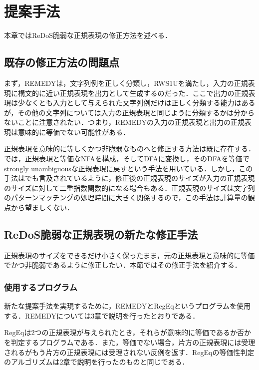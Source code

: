 \documentclass[a4paper, 12pt, dvipdfmx, uplatex]{jsreport}
\begin{document}
\chapter{提案手法}
本章ではReDoS脆弱な正規表現の修正方法を述べる．

\section{既存の修正方法の問題点}\label{issue}
まず，REMEDYは，文字列例を正しく分類し，RWS1Uを満たし，入力の正規表現に構文的に近い正規表現を出力として生成するのだった．ここで出力の正規表現は少なくとも入力として与えられた文字列例だけは正しく分類する能力はあるが，その他の文字列については入力の正規表現と同じように分類するかは分からないことに注意されたい．つまり，REMEDYの入力の正規表現と出力の正規表現は意味的に等価でない可能性がある．

正規表現を意味的に等しくかつ非脆弱なものへと修正する方法は既に存在する．\cite{harmless}では，正規表現と等価なNFAを構成，そしてDFAに変換し，そのDFAを等価でstrongly unambiguousな正規表現に戻すという手法を用いている．しかし，この手法は\cite{harmless}でも言及されているように，修正後の正規表現のサイズが入力の正規表現のサイズに対して二重指数関数的になる場合もある．正規表現のサイズは文字列のパターンマッチングの処理時間に大きく関係するので，この手法は計算量の観点から望ましくない．

\section{ReDoS脆弱な正規表現の新たな修正手法}
正規表現のサイズをできるだけ小さく保ったまま，元の正規表現と意味的に等価でかつ非脆弱であるように修正したい．本節ではその修正手法を紹介する．

\subsection{使用するプログラム}
新たな提案手法を実現するために，REMEDYとRegEq\cite{regeq}というプログラムを使用する．REMEDYについては3章で説明を行ったとおりである．


RegEqは2つの正規表現が与えられたとき，それらが意味的に等価であるか否かを判定するプログラムである．また，等価でない場合，片方の正規表現には受理されるがもう片方の正規表現には受理されない反例を返す．RegEqの等価性判定のアルゴリズムは2章で説明を行った\cite{hopcroft}のものと同じである．
\end{document}
